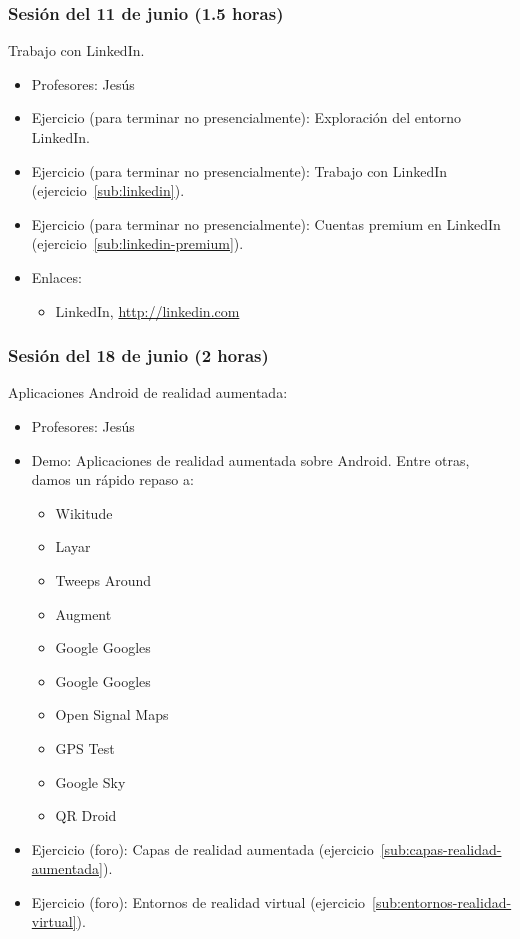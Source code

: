 \documentclass[a4paper,12pt]{article}
\begin{document}
\subsubsection{Sesión del 11 de junio (1.5 horas)}

Trabajo con LinkedIn.

\begin{itemize}
\item Profesores: Jesús
\item Ejercicio (para terminar no presencialmente): Exploración del entorno LinkedIn.
\item Ejercicio (para terminar no presencialmente): Trabajo con LinkedIn (ejercicio~\ref{sub:linkedin}).
\item Ejercicio (para terminar no presencialmente): Cuentas premium en LinkedIn (ejercicio~\ref{sub:linkedin-premium}).
\item Enlaces:
  \begin{itemize}
  \item LinkedIn, \url{http://linkedin.com}
  \end{itemize}
\end{itemize}

\subsubsection{Sesión del 18 de junio (2 horas)}

Aplicaciones Android de realidad aumentada:

\begin{itemize}
\item Profesores: Jesús
\item Demo: Aplicaciones de realidad aumentada sobre Android. Entre otras, damos un rápido repaso a:
  \begin{itemize}
  \item Wikitude
  \item Layar
  \item Tweeps Around
  \item Augment
  \item Google Googles
  \item Google Googles
  \item Open Signal Maps
  \item GPS Test
  \item Google Sky
  \item QR Droid
  \end{itemize}
\item Ejercicio (foro): Capas de realidad aumentada (ejercicio~\ref{sub:capas-realidad-aumentada}).
\item Ejercicio (foro): Entornos de realidad virtual (ejercicio~\ref{sub:entornos-realidad-virtual}).
\end{itemize}
\end{document}
